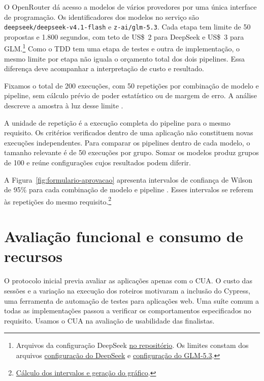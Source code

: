 \documentclass[a4paper,12pt,twoside,english,brazilian]{book}
\begin{document}
O OpenRouter dá acesso a modelos de vários provedores por uma única
interface de programação. Os identificadores dos modelos no serviço são
\texttt{deepseek/deepseek-v4.1-flash} e \texttt{z-ai/glm-5.3}.
Cada etapa tem limite de 50 propostas e 1.800 segundos, com teto de US\$~2
para DeepSeek e US\$~3 para GLM.\footnote{Arquivos da configuração DeepSeek
\href{https://github.com/Educg550/tcc/tree/ee6d001c1f618419c6184644d18aa97bb33bcf9a/demos/requisitos/01-formulario-docentes-deepseek}{no repositório}.
Os limites constam dos arquivos \href{https://github.com/Educg550/tcc/blob/ee6d001c1f618419c6184644d18aa97bb33bcf9a/demos/requisitos/01-formulario-docentes-deepseek/alvo.toml}{configuração do DeepSeek}
e \href{https://github.com/Educg550/tcc/blob/ee6d001c1f618419c6184644d18aa97bb33bcf9a/demos/requisitos/01-formulario-docentes-glm/alvo.toml}{configuração do GLM-5.3}.}
Como o TDD tem uma etapa de testes e outra de
implementação, o mesmo limite por etapa não iguala o orçamento total dos dois
pipelines. Essa diferença deve acompanhar a interpretação de custo e resultado.

Fixamos o total de 200 execuções, com 50 repetições por combinação de modelo
e pipeline, sem cálculo prévio de poder estatístico ou de margem de erro.
A análise descreve a amostra à luz desse limite \citep{lakens2022sample}.

A unidade de repetição é a execução completa do pipeline para o mesmo
requisito. Os critérios verificados dentro de uma aplicação não constituem
novas execuções independentes. Para comparar os pipelines dentro de cada
modelo, o tamanho relevante é de 50 execuções por grupo. Somar os modelos
produz grupos de 100 e reúne configurações cujos resultados podem diferir.

A Figura~\ref{fig:formulario-aprovacao} apresenta intervalos de confiança
de Wilson de 95\% para cada combinação de modelo e pipeline
\citep{brown2001interval,nistProporcoes}.
Esses intervalos se referem às repetições do mesmo requisito.\footnote{\href{https://github.com/Educg550/tcc/blob/ee6d001c1f618419c6184644d18aa97bb33bcf9a/tex/figuras/graficos-formulario.py}{Cálculo dos intervalos e geração do gráfico}.}

\section{Avaliação funcional e consumo de recursos}
\label{sec:formulario-avaliacao}

O protocolo inicial previa avaliar as aplicações apenas com o CUA.
O custo das sessões e a variação na execução dos roteiros motivaram a
inclusão do Cypress, uma ferramenta de automação de testes para aplicações
web. Uma suíte comum a todas as implementações passou a verificar os
comportamentos especificados no requisito. Usamos o CUA na avaliação
de usabilidade das finalistas.
\end{document}
